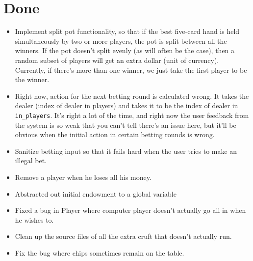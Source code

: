 \documentclass[10pt]{article}
\begin{document}
\section*{Done}
\begin{itemize}
\item \CheckedBox Implement split pot functionality, so that if the
  best five-card hand is held simultaneously by two or more players,
  the pot is split between all the winners. If the pot doesn't split
  evenly (as will often be the case), then a random subset of players
  will get an extra dollar (unit of currency). Currently, if there's
  more than one winner, we just take the first player to be the
  winner.
\item \CheckedBox Right now, action for the next betting round is
  calculated wrong. It takes the dealer (index of dealer in players)
  and takes it to be the index of dealer in \verb^in_players^. It's
  right a lot of the time, and right now the user feedback from the
  system is so weak that you can't tell there's an issue here, but
  it'll be obvious when the initial action in certain betting rounds
  is wrong.
\item \CheckedBox Sanitize betting input so that it fails hard when
  the user tries to make an illegal bet.
\item \CheckedBox Remove a player when he loses all his money.
\item \CheckedBox Abstracted out initial endowment to a global
  variable
\item \CheckedBox Fixed a bug in Player where computer player doesn't
  actually go all in when he wishes to.
\item \CheckedBox Clean up the source files of all the extra cruft
  that doesn't actually run.
\item \CheckedBox Fix the bug where chips sometimes remain on the table.
\end{itemize}
\end{document}
